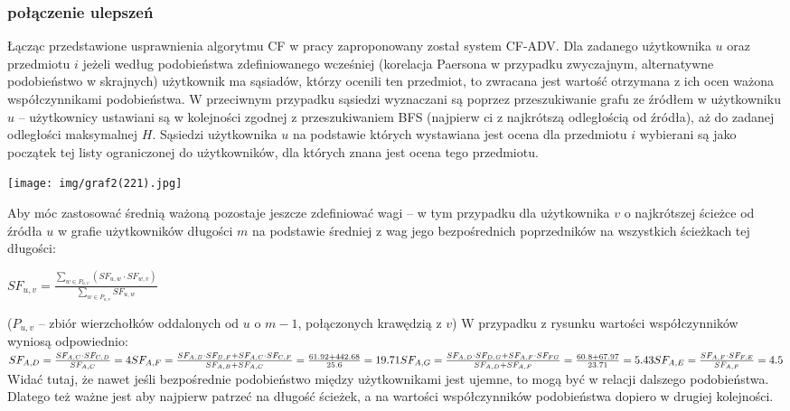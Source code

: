 \documentclass{pracamgr}
\begin{document}
    \subsubsection{połączenie ulepszeń}
     Łącząc przedstawione usprawnienia algorytmu CF w pracy \cite{221} zaproponowany został system CF-ADV.\newline
     Dla zadanego użytkownika $u$ oraz przedmiotu $i$ jeżeli według podobieństwa zdefiniowanego wcześniej
     (korelacja Paersona w przypadku zwyczajnym, alternatywne podobieństwo w skrajnych) użytkownik ma sąsiadów, którzy ocenili ten przedmiot,
     to zwracana jest wartość otrzymana z ich ocen ważona współczynnikami podobieństwa.\newline
     W przeciwnym przypadku sąsiedzi wyznaczani są poprzez przeszukiwanie grafu ze źródłem w użytkowniku $u$
     -- użytkownicy ustawiani są w kolejności zgodnej z przeszukiwaniem BFS (najpierw ci z najkrótszą odległością od źródła),
     aż do zadanej odległości maksymalnej $H$.
     Sąsiedzi użytkownika $u$ na podstawie których wystawiana jest ocena dla przedmiotu $i$
     wybierani są jako początek tej listy ograniczonej do użytkowników, dla których znana jest ocena tego przedmiotu.
     \begin{center}
      \texttt{[image: img/graf2(221).jpg]}
     \end{center}
     Aby móc zastosować średnią ważoną pozostaje jeszcze zdefiniować wagi
     -- w tym przypadku dla użytkownika $v$ o najkrótszej ścieżce od źródła $u$ w grafie użytkowników długości $m$
     na podstawie średniej z wag jego bezpośrednich poprzedników na wszystkich ścieżkach tej długości:
     \begin{center}
      $SF_{u,v}=\frac{\sum\limits_{w\in P_{u,v}}(SF_{u,w}\cdot SF_{w,v})}{\sum\limits_{w\in P_{u,v}}SF_{u,w}}$
     \end{center}
     {\scriptsize
      ($P_{u,v}$ -- zbiór wierzchołków oddalonych od $u$ o $m-1$, połączonych krawędzią z $v$)
     }\newline
     W przypadku z rysunku wartości współczynników wyniosą odpowiednio:\newline
     $
     SF_{A,D}=\frac{SF_{A,C}\cdot SF_{C,D}}{SF_{A,C}}=4\newline
     SF_{A,F}=\frac{SF_{A,B}\cdot SF_{B,F}+SF_{A,C}\cdot SF_{C,F}}{SF_{A,B}+SF_{A,C}}=\frac{61.92+442.68}{25.6}=19.71\newline
     SF_{A,G}=\frac{SF_{A,D}\cdot SF_{D,G}+SF_{A,F}\cdot SF_{FG}}{SF_{A,D}+SF_{A,F}}=\frac{60.8+67.97}{23.71}=5.43\newline
     SF_{A,E}=\frac{SF_{A,F}\cdot SF_{F,E}}{SF_{A,F}}=4.5\newline   
     $
     Widać tutaj, że nawet jeśli bezpośrednie podobieństwo między użytkownikami jest ujemne, to mogą być w relacji dalszego podobieństwa.
     Dlatego też ważne jest aby najpierw patrzeć na długość ścieżek, a na wartości współczynników podobieństwa dopiero w drugiej kolejności.
\end{document}
